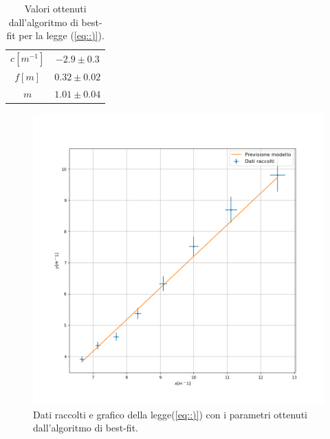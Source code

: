\documentclass{article}
\begin{document}
\begin{table}[h!]
		\centering
			\begin{tabular}{|cc|}
				\hline
				$c [m^{-1}]$ & $ -2.9 \pm 0.3$\\
				$f[m]$ & $0.32\pm 0.02$\\
				$m$ & $ 1.01 \pm 0.04$\\
				\hline
			\end{tabular}
		\caption{Valori ottenuti dall'algoritmo di best-fit per la legge (\ref{eq::)}).}
		\label{tab:len}	
\end{table}



\begin{figure}[h!]
	\includegraphics[width=\textwidth]{Dati_raccoltilen.png}
	\caption{Dati raccolti e grafico della legge(\ref{eq::)}) con i parametri ottenuti dall'algoritmo di best-fit.}
	\label{fig:len}
\end{figure}
\end{document}

